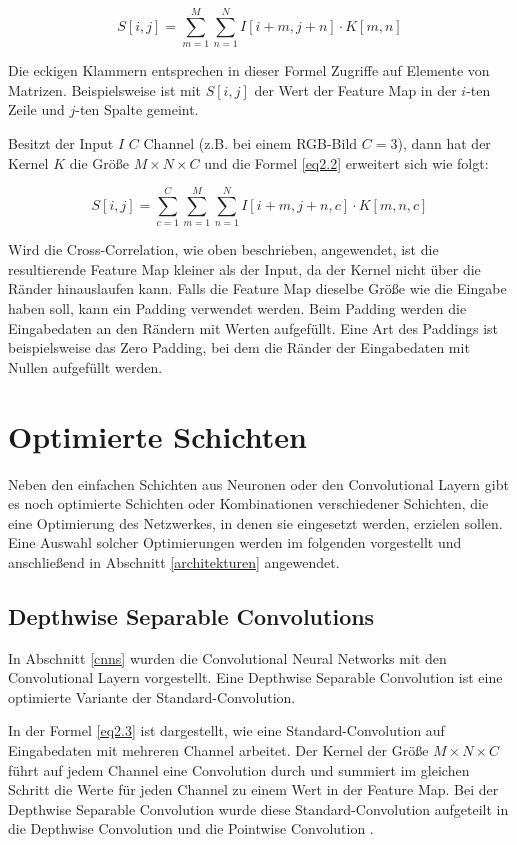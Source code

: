 \begin{equation}
S[i, j] = \sum_{m=1}^{M} \sum_{n=1}^{N} I[i+m, j+n] \cdot K[m, n]
\label{eq2.2}
\end{equation}

Die eckigen Klammern entsprechen in dieser Formel Zugriffe auf Elemente von Matrizen. Beispielsweise ist mit $S[i, j]$ der Wert der Feature Map in der $i$-ten Zeile und $j$-ten Spalte gemeint.

Besitzt der Input $I$ $C$ Channel (z.B. bei einem RGB-Bild $C = 3$), dann hat der Kernel $K$ die Größe $M \times N \times C$ und die Formel \ref{eq2.2} erweitert sich wie folgt:

\begin{equation}
S[i, j] = \sum_{c=1}^{C} \sum_{m=1}^{M} \sum_{n=1}^{N} I[i+m, j+n, c] \cdot K[m, n, c]
\label{eq2.3}
\end{equation}

Wird die Cross-Correlation, wie oben beschrieben, angewendet, ist die resultierende Feature Map kleiner als der Input, da der Kernel nicht über die Ränder hinauslaufen kann. Falls die Feature Map dieselbe Größe wie die Eingabe haben soll, kann ein Padding verwendet werden. Beim Padding werden die Eingabedaten an den Rändern mit Werten aufgefüllt. Eine Art des Paddings ist beispielsweise das Zero Padding, bei dem die Ränder der Eingabedaten mit Nullen aufgefüllt werden.



\section{Optimierte Schichten}
Neben den einfachen Schichten aus Neuronen oder den Convolutional Layern gibt es noch optimierte Schichten oder Kombinationen verschiedener Schichten, die eine Optimierung des Netzwerkes, in denen sie eingesetzt werden, erzielen sollen. 
Eine Auswahl solcher Optimierungen werden im folgenden vorgestellt und anschließend in Abschnitt \ref{architekturen} angewendet.


\subsection{Depthwise Separable Convolutions}
\label{depthwise_separable_convolutions}
In Abschnitt \ref{cnns} wurden die Convolutional Neural Networks mit den Convolutional Layern vorgestellt. Eine Depthwise Separable Convolution ist eine optimierte Variante der Standard-Convolution.

In der Formel \ref{eq2.3} ist dargestellt, wie eine Standard-Convolution auf Eingabedaten mit mehreren Channel arbeitet. Der Kernel der Größe $M \times N \times C$ führt auf jedem Channel eine Convolution durch und summiert im gleichen Schritt die Werte für jeden Channel zu einem Wert in der Feature Map. Bei der Depthwise Separable Convolution wurde diese Standard-Convolution aufgeteilt in die Depthwise Convolution und die Pointwise Convolution \cite{howard_mobilenets_2017}.

